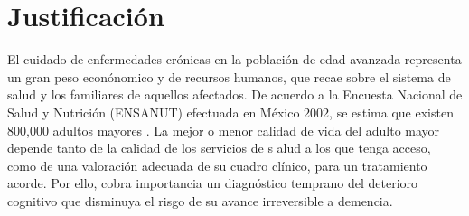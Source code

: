 \documentclass[12pt,a4paper]{mitthesis}
\begin{document}
%


\section{Justificaci\'on}

El cuidado de enfermedades cr\'onicas en la poblaci\'on de edad avanzada representa un gran peso 
econ\'onomico y de recursos humanos, que recae sobre el sistema de salud y los familiares de 
aquellos afectados. 
De acuerdo a la Encuesta Nacional de Salud y Nutrici\'on (ENSANUT) efectuada en M\'exico 2002, se 
estima que existen 800,000 adultos mayores \cite{Sosa12}. 
La mejor o menor calidad de vida del adulto mayor depende tanto de la calidad de los servicios de s
alud a los que tenga acceso, como de una valoraci\'on adecuada de su cuadro cl\'inico, para un 
tratamiento acorde. Por ello, cobra importancia un diagn\'ostico temprano del deterioro cognitivo 
que disminuya el risgo de su avance irreversible a demencia.
\end{document}
